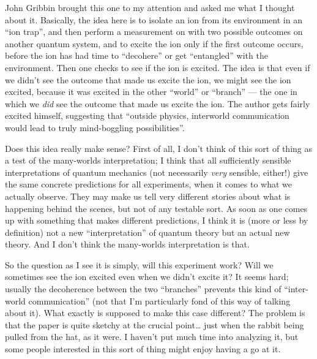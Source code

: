 \documentclass{article}
\def\tightlist{}
\renewcommand{\texttt}[1]{%
  \begingroup
  \ttfamily
  \begingroup\lccode`~=`/\lowercase{\endgroup\def~}{/\discretionary{}{}{}}%
  \begingroup\lccode`~=`[\lowercase{\endgroup\def~}{[\discretionary{}{}{}}%
  \begingroup\lccode`~=`.\lowercase{\endgroup\def~}{.\discretionary{}{}{}}%
  \catcode`/=\active\catcode`[=\active\catcode`.=\active
  \scantokens{#1\noexpand}%
  \endgroup
}
\begin{document}

John Gribbin brought this one to my attention and asked me what I
thought about it. Basically, the idea here is to isolate an ion from its
environment in an ``ion trap'', and then perform a measurement on with
two possible outcomes on another quantum system, and to excite the ion
only if the first outcome occurs, before the ion has had time to
``decohere'' or get ``entangled'' with the environment. Then one checks
to see if the ion is excited. The idea is that even if we didn't see the
outcome that made us excite the ion, we might see the ion excited,
because it was excited in the other ``world'' or ``branch'' --- the one
in which we \emph{did} see the outcome that made us excite the ion. The
author gets fairly excited himself, suggesting that ``outside physics,
interworld communication would lead to truly mind-boggling
possibilities''.

Does this idea really make sense? First of all, I don't think of this
sort of thing as a test of the many-worlds interpretation; I think that
all sufficiently sensible interpretations of quantum mechanics (not
necessarily \emph{very} sensible, either!) give the same concrete
predictions for all experiments, when it comes to what we actually
observe. They may make us tell very different stories about what is
happening behind the scenes, but not of any testable sort. As soon as
one comes up with something that makes different predictions, I think it
is (more or less by definition) not a new ``interpretation'' of quantum
theory but an actual new theory. And I don't think the many-worlds
interpretation is that.

So the question as I see it is simply, will this experiment work? Will
we sometimes see the ion excited even when we didn't excite it? It seems
hard; usually the decoherence between the two ``branches'' prevents this
kind of ``inter-world communication'' (not that I'm particularly fond of
this way of talking about it). What exactly is supposed to make this
case different? The problem is that the paper is quite sketchy at the
crucial point\ldots{} just when the rabbit being pulled from the hat, as
it were. I haven't put much time into analyzing it, but some people
interested in this sort of thing might enjoy having a go at it.
\end{document}
